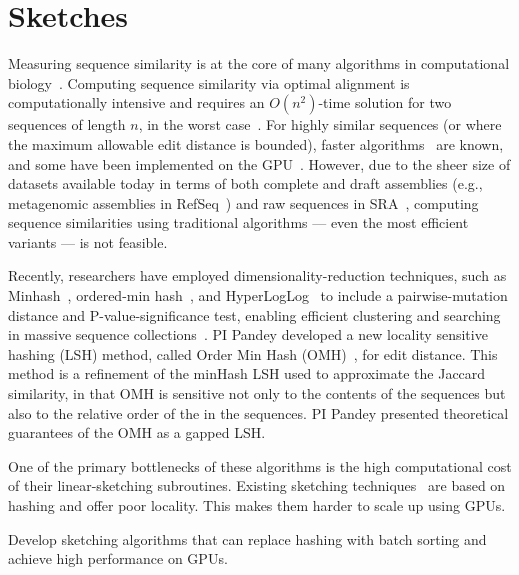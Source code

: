 
\section{Sketches}


Measuring sequence similarity is at the core of many algorithms in  computational biology~\cite{Myers2000, Langmead2012,Li2010}. Computing sequence similarity via optimal alignment is computationally intensive and requires an $O(n^2)$-time solution for two sequences of length $n$, in the worst case~\cite{backurs2015edit}.  For highly similar sequences (or where the maximum allowable edit distance is bounded), faster algorithms~\cite{MarcoSola2023} are known, and some have been implemented on the GPU~\cite{AguadoPuig2023}. However, due to the sheer size of datasets available today in terms of both complete and draft assemblies (e.g., metagenomic assemblies in RefSeq~\cite{RefSeq}) and raw sequences in SRA~\cite{SRA}, computing sequence similarities using traditional algorithms --- even the most efficient variants --- is not feasible.

Recently, researchers have employed dimensionality-reduction techniques, such as Minhash~\cite{Broder97}, ordered-min hash~\cite{Marais2019}, and HyperLogLog~\cite{Baker2019} to include a pairwise-mutation distance and P-value-significance test, enabling  efficient clustering and searching in massive sequence collections~\cite{Mitzenmacher2014,ondov2016mash,Marais2019,Baker2019}. PI Pandey developed a new locality sensitive hashing (LSH) method, called Order Min Hash (OMH)~\cite{Marais2019}, for  edit distance. This method is a refinement of the minHash LSH used to approximate the Jaccard similarity, in that OMH is sensitive not only to the \kmer contents of the sequences but also to the relative order of the \kmers in the sequences. PI Pandey presented theoretical guarantees of the OMH as a gapped LSH\@.

One of the primary bottlenecks of these algorithms is the high computational cost of their linear-sketching subroutines. Existing sketching techniques~\cite{ondov2016mash,Marais2019} are based on hashing and offer poor locality. This makes them harder to scale up using GPUs.

\begin{rproblem}
Develop sketching algorithms that can replace hashing with batch sorting and achieve high performance on GPUs.
\end{rproblem}

